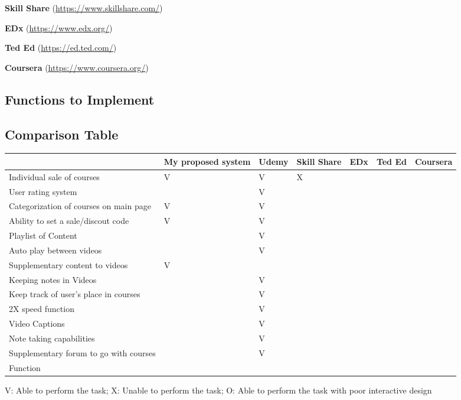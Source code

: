 \documentclass{article}
\begin{document}
\textbf{Skill Share} (\url{https://www.skillshare.com/})

\textbf{EDx} (\url{https://www.edx.org/})

\textbf{Ted Ed} (\url{https://ed.ted.com/})

\textbf{Coursera} (\url{https://www.coursera.org/})


\subsection{Functions to Implement}



\subsection{Comparison Table}
\begin{tabular}{ | m{10em} | m{2cm}| m{1cm} | m{1.5cm}| m{1cm} | m{1cm}| m{1.5cm} | } 
  \hline
   & My proposed system & Udemy & Skill Share & EDx & Ted Ed & Coursera\\ 
  \hline
  Individual sale of courses & V & V & X & & & \\ 
  \hline
  User rating system &  & V & & & & \\ 
  \hline
  Categorization of courses on main page & V & V & & & & \\ 
  \hline
  Ability to set a sale/discout code & V & V & & & & \\ 
  \hline
  Playlist of Content & & V & & & & \\ 
  \hline
  Auto play between videos & & V & & & & \\ 
  \hline
  Supplementary content to videos & V & & & & & \\ 
  \hline
  Keeping notes in Videos & & V & & & & \\ 
  \hline
  Keep track of user's place in courses & & V & & & & \\ 
  \hline
  2X speed function & & V & & & & \\ 
  \hline
  Video Captions & & V & & & & \\ 
  \hline
  Note taking capabilities & & V & & & & \\ 
  \hline
  Supplementary forum to go with courses & & V & & & & \\ 
  \hline
  Function & & & & & & \\ 
  \hline
\end{tabular}
V: Able to perform the task; X: Unable to perform the task; O: Able to perform the task with poor interactive design
\end{document}
